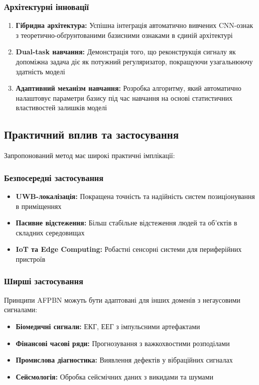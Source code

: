 \documentclass[12pt,a4paper]{article}
\begin{document}
\subsubsection{Архітектурні інновації}

\begin{enumerate}
	\item \textbf{Гібридна архітектура:} Успішна інтеграція автоматично вивчених CNN-ознак з теоретично-обґрунтованими базисними ознаками в єдиній архітектурі
	
	\item \textbf{Dual-task навчання:} Демонстрація того, що реконструкція сигналу як допоміжна задача діє як потужний регуляризатор, покращуючи узагальнюючу здатність моделі
	
	\item \textbf{Адаптивний механізм навчання:} Розробка алгоритму, який автоматично налаштовує параметри базису під час навчання на основі статистичних властивостей залишків моделі
\end{enumerate}

\subsection{Практичний вплив та застосування}

Запропонований метод має широкі практичні імплікації:

\subsubsection{Безпосередні застосування}

\begin{itemize}
	\item \textbf{UWB-локалізація:} Покращена точність та надійність систем позиціонування в приміщеннях
	\item \textbf{Пасивне відстеження:} Більш стабільне відстеження людей та об'єктів в складних середовищах
	\item \textbf{IoT та Edge Computing:} Робастні сенсорні системи для периферійних пристроїв
\end{itemize}

\subsubsection{Ширші застосування}

Принципи AFPBN можуть бути адаптовані для інших доменів з негаусовими сигналами:
\begin{itemize}
	\item \textbf{Біомедичні сигнали:} ЕКГ, ЕЕГ з імпульсними артефактами
	\item \textbf{Фінансові часові ряди:} Прогнозування з важкохвостими розподілами
	\item \textbf{Промислова діагностика:} Виявлення дефектів у вібраційних сигналах
	\item \textbf{Сейсмологія:} Обробка сейсмічних даних з викидами та шумами
\end{itemize}
\end{document}
